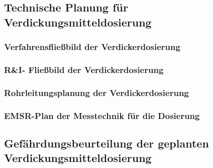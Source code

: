 \subsection{Technische Planung für Verdickungsmitteldosierung}
\subsubsection{Verfahrensfließbild der Verdickerdosierung}
\subsubsection{R\&I- Fließbild der Verdickerdosierung}
\subsubsection{Rohrleitungsplanung der Verdickerdosierung}

\subsubsection{EMSR-Plan der Messtechnik für die Dosierung}

\subsection{Gefährdungsbeurteilung der geplanten Verdickungsmitteldosierung}


